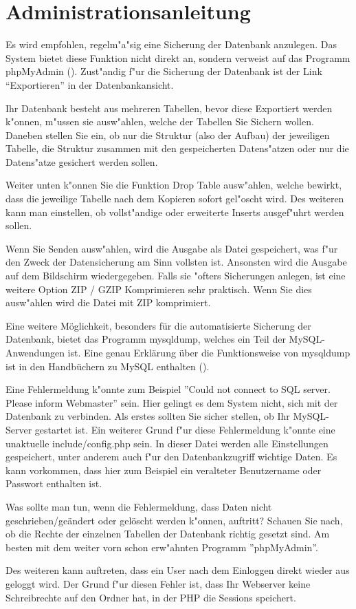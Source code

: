\section{Administrationsanleitung}


Es wird empfohlen, regelm"a"sig eine Sicherung der Datenbank anzulegen. Das System bietet diese Funktion nicht direkt an,
sondern verweist auf das Programm phpMyAdmin (). Zust"andig f"ur die Sicherung der Datenbank ist der Link ``Exportieren'' in der Datenbankansicht.


Ihr Datenbank besteht aus mehreren Tabellen, bevor diese Exportiert werden k"onnen, m"ussen sie ausw"ahlen, welche der Tabellen Sie Sichern wollen. 
Daneben stellen Sie ein, ob nur die Struktur 
(also der Aufbau) der jeweiligen Tabelle, die Struktur zusammen mit den gespeicherten Datens"atzen oder nur die Datens"atze gesichert werden sollen.

Weiter unten k"onnen Sie die Funktion Drop Table ausw"ahlen, welche bewirkt, dass die jeweilige Tabelle nach dem Kopieren sofort gel"oscht wird. Des weiteren 
kann man einstellen, ob vollst"andige oder erweiterte Inserts ausgef"uhrt werden sollen.  

Wenn Sie Senden ausw"ahlen, wird die Ausgabe als Datei gespeichert, was f"ur den Zweck der Datensicherung am Sinn vollsten ist. Ansonsten wird die 
Ausgabe auf dem Bildschirm wiedergegeben. 
Falls sie "ofters Sicherungen anlegen, ist eine weitere Option ZIP / GZIP Komprimieren sehr praktisch. Wenn Sie dies ausw"ahlen wird die Datei mit ZIP komprimiert.

Eine weitere Möglichkeit, besonders für die automatisierte Sicherung der Datenbank, bietet das Programm mysqldump, welches ein Teil der MySQL-Anwendungen ist. Eine genau Erklärung über die Funktionsweise von mysqldump ist in den Handbüchern zu MySQL enthalten ().


Eine Fehlermeldung k"onnte zum Beispiel ''Could not connect to SQL server. Please inform Webmaster'' sein. Hier gelingt es dem System nicht, sich mit 
der Datenbank zu verbinden. Als erstes sollten Sie sicher stellen, ob Ihr MySQL-Server gestartet ist. Ein weiterer Grund f"ur diese Fehlermeldung k"onnte 
eine unaktuelle include/config.php sein. In dieser Datei werden alle Einstellungen gespeichert, unter anderem auch f"ur den Datenbankzugriff wichtige Daten. Es 
kann vorkommen, dass hier zum Beispiel ein veralteter Benutzername oder Passwort enthalten ist.

Was sollte man tun, wenn die Fehlermeldung, dass Daten nicht geschrieben/geändert oder gelöscht werden k"onnen, auftritt? Schauen Sie nach, ob die Rechte 
der einzelnen Tabellen der Datenbank richtig gesetzt sind. Am besten mit dem weiter vorn schon erw"ahnten Programm ''phpMyAdmin''.

Des weiteren kann auftreten, dass ein User nach dem Einloggen direkt wieder aus geloggt wird. Der Grund f"ur diesen Fehler ist, dass Ihr Webserver keine 
Schreibrechte auf den Ordner hat, in der PHP die Sessions speichert.
